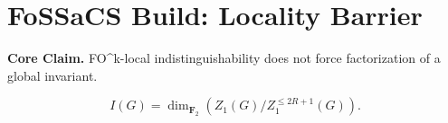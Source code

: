 \section*{FoSSaCS Build: Locality Barrier}

\textbf{Core Claim.}
FO^k-local indistinguishability does not force factorization of a global invariant.

\[
I(G) = \dim_{\mathbf{F}_2}(Z_1(G)/Z_1^{\le 2R+1}(G)).
\]
